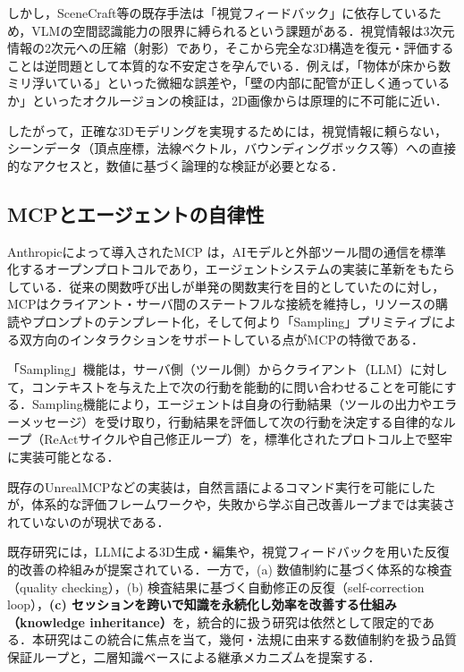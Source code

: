\documentclass[dvipdfmx, a4paper, 9pt]{deimj}
\begin{document}
しかし，SceneCraft等の既存手法は「視覚フィードバック」に依存しているため，VLMの空間認識能力の限界に縛られるという課題がある．視覚情報は3次元情報の2次元への圧縮（射影）であり，そこから完全な3D構造を復元・評価することは逆問題として本質的な不安定さを孕んでいる．例えば，「物体が床から数ミリ浮いている」といった微細な誤差や，「壁の内部に配管が正しく通っているか」といったオクルージョンの検証は，2D画像からは原理的に不可能に近い．

したがって，正確な3Dモデリングを実現するためには，視覚情報に頼らない，シーンデータ（頂点座標，法線ベクトル，バウンディングボックス等）への直接的なアクセスと，数値に基づく論理的な検証が必要となる．

\subsection{MCPとエージェントの自律性}

Anthropicによって導入されたMCP\cite{anthropic2024mcp} は，AIモデルと外部ツール間の通信を標準化するオープンプロトコルであり，エージェントシステムの実装に革新をもたらしている．従来の関数呼び出しが単発の関数実行を目的としていたのに対し\cite{schick2024toolformer}，MCPはクライアント・サーバ間のステートフルな接続を維持し，リソースの購読やプロンプトのテンプレート化，そして何より「Sampling」プリミティブによる双方向のインタラクションをサポートしている点がMCPの特徴である．

「Sampling」機能は，サーバ側（ツール側）からクライアント（LLM）に対して，コンテキストを与えた上で次の行動を能動的に問い合わせることを可能にする．Sampling機能により，エージェントは自身の行動結果（ツールの出力やエラーメッセージ）を受け取り，行動結果を評価して次の行動を決定する自律的なループ（ReActサイクル\cite{yao2023react}や自己修正ループ\cite{shinn2024reflexion,xi2023rise}）を，標準化されたプロトコル上で堅牢に実装可能となる．

既存のUnrealMCP\cite{unrealmcp2024}などの実装は，自然言語によるコマンド実行を可能にしたが，体系的な評価フレームワークや，失敗から学ぶ自己改善ループまでは実装されていないのが現状である．

既存研究には，LLMによる3D生成・編集や，視覚フィードバックを用いた反復的改善の枠組みが提案されている．一方で，(a) 数値制約に基づく体系的な検査（quality checking），(b) 検査結果に基づく自動修正の反復（self-correction loop），\textbf{(c) セッションを跨いで知識を永続化し効率を改善する仕組み（knowledge inheritance）}を，統合的に扱う研究は依然として限定的である．本研究はこの統合に焦点を当て，幾何・法規に由来する数値制約を扱う品質保証ループと，二層知識ベースによる継承メカニズムを提案する．
\end{document}
